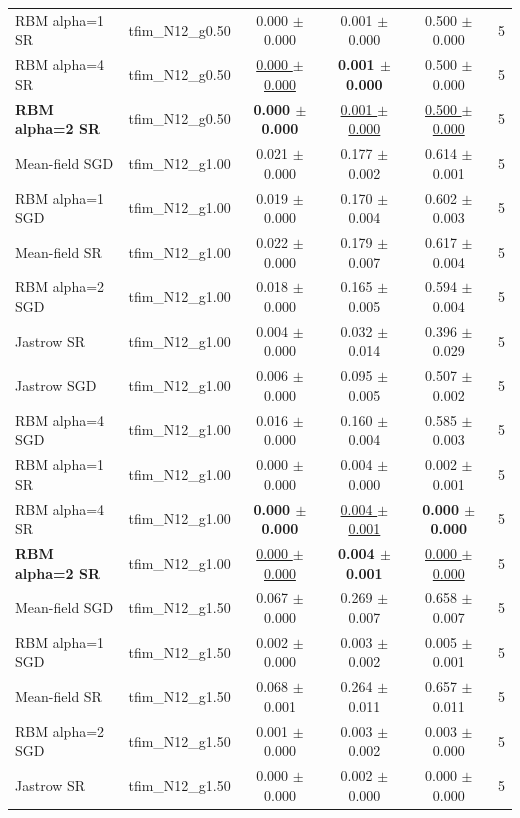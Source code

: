 \begin{tabular}{llcccc}
RBM alpha=1 SR & tfim\_N12\_g0.50 & 0.000 $\pm$ 0.000 & 0.001 $\pm$ 0.000 & 0.500 $\pm$ 0.000 & 5 \\
RBM alpha=4 SR & tfim\_N12\_g0.50 & \underline{0.000 $\pm$ 0.000} & \textbf{0.001 $\pm$ 0.000} & 0.500 $\pm$ 0.000 & 5 \\
\textbf{RBM alpha=2 SR} & tfim\_N12\_g0.50 & \textbf{0.000 $\pm$ 0.000} & \underline{0.001 $\pm$ 0.000} & \underline{0.500 $\pm$ 0.000} & 5 \\
\midrule
Mean-field SGD & tfim\_N12\_g1.00 & 0.021 $\pm$ 0.000 & 0.177 $\pm$ 0.002 & 0.614 $\pm$ 0.001 & 5 \\
RBM alpha=1 SGD & tfim\_N12\_g1.00 & 0.019 $\pm$ 0.000 & 0.170 $\pm$ 0.004 & 0.602 $\pm$ 0.003 & 5 \\
Mean-field SR & tfim\_N12\_g1.00 & 0.022 $\pm$ 0.000 & 0.179 $\pm$ 0.007 & 0.617 $\pm$ 0.004 & 5 \\
RBM alpha=2 SGD & tfim\_N12\_g1.00 & 0.018 $\pm$ 0.000 & 0.165 $\pm$ 0.005 & 0.594 $\pm$ 0.004 & 5 \\
Jastrow SR & tfim\_N12\_g1.00 & 0.004 $\pm$ 0.000 & 0.032 $\pm$ 0.014 & 0.396 $\pm$ 0.029 & 5 \\
Jastrow SGD & tfim\_N12\_g1.00 & 0.006 $\pm$ 0.000 & 0.095 $\pm$ 0.005 & 0.507 $\pm$ 0.002 & 5 \\
RBM alpha=4 SGD & tfim\_N12\_g1.00 & 0.016 $\pm$ 0.000 & 0.160 $\pm$ 0.004 & 0.585 $\pm$ 0.003 & 5 \\
RBM alpha=1 SR & tfim\_N12\_g1.00 & 0.000 $\pm$ 0.000 & 0.004 $\pm$ 0.000 & 0.002 $\pm$ 0.001 & 5 \\
RBM alpha=4 SR & tfim\_N12\_g1.00 & \textbf{0.000 $\pm$ 0.000} & \underline{0.004 $\pm$ 0.001} & \textbf{0.000 $\pm$ 0.000} & 5 \\
\textbf{RBM alpha=2 SR} & tfim\_N12\_g1.00 & \underline{0.000 $\pm$ 0.000} & \textbf{0.004 $\pm$ 0.001} & \underline{0.000 $\pm$ 0.000} & 5 \\
\midrule
Mean-field SGD & tfim\_N12\_g1.50 & 0.067 $\pm$ 0.000 & 0.269 $\pm$ 0.007 & 0.658 $\pm$ 0.007 & 5 \\
RBM alpha=1 SGD & tfim\_N12\_g1.50 & 0.002 $\pm$ 0.000 & 0.003 $\pm$ 0.002 & 0.005 $\pm$ 0.001 & 5 \\
Mean-field SR & tfim\_N12\_g1.50 & 0.068 $\pm$ 0.001 & 0.264 $\pm$ 0.011 & 0.657 $\pm$ 0.011 & 5 \\
RBM alpha=2 SGD & tfim\_N12\_g1.50 & 0.001 $\pm$ 0.000 & 0.003 $\pm$ 0.002 & 0.003 $\pm$ 0.000 & 5 \\
Jastrow SR & tfim\_N12\_g1.50 & 0.000 $\pm$ 0.000 & 0.002 $\pm$ 0.000 & 0.000 $\pm$ 0.000 & 5 \\

\end{tabular}
